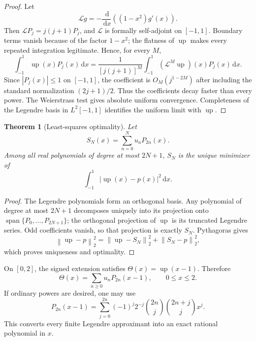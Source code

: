 \documentclass[11pt,oneside]{article}
\newtheorem{theorem}{Theorem}[section]
\theoremstyle{definition}
\theoremstyle{remark}
\newcommand{\upf}{\operatorname{up}}
\newcommand{\dd}{\,\mathrm d}
\newcommand{\Thetaf}{\Theta}
\newcommand{\norm}[1]{\left\lVert#1\right\rVert}
\begin{document}
\begin{proof}
Let
\begin{equation}\label{eq:Legendre-operator}
  \mathcal Lg=-\frac{\dd}{\dd x}\left((1-x^2)g'(x)\right).
\end{equation}
Then $\mathcal LP_j=j(j+1)P_j$, and $\mathcal L$ is formally self-adjoint on
$[-1,1]$.  Boundary terms vanish because of the factor $1-x^2$; the flatness of
$\upf$ makes every repeated integration legitimate.  Hence, for every $M$,
\begin{equation}\label{eq:Legendre-decay-proof}
 \int_{-1}^{1}\upf(x)P_j(x)\dd x
 =\frac{1}{[j(j+1)]^M}
 \int_{-1}^{1}(\mathcal L^M\upf)(x)P_j(x)\dd x.
\end{equation}
Since $|P_j(x)|\le1$ on $[-1,1]$, the coefficient is $O_M(j^{1-2M})$ after
including the standard normalization $(2j+1)/2$.  Thus the coefficients decay
faster than every power.  The Weierstrass test gives absolute uniform convergence.
Completeness of the Legendre basis in $L^2[-1,1]$ identifies the uniform limit with
$\upf$.
\end{proof}

\begin{theorem}[Least-squares optimality]\label{thm:Legendre-best}
Let
\begin{equation}\label{eq:Legendre-partial}
  S_N(x)=\sum_{n=0}^{N}u_nP_{2n}(x).
\end{equation}
Among all real polynomials of degree at most $2N+1$, $S_N$ is the unique minimizer
of
\begin{equation}\label{eq:L2-error}
  \int_{-1}^{1}|\upf(x)-p(x)|^2\dd x.
\end{equation}
\end{theorem}

\begin{proof}
The Legendre polynomials form an orthogonal basis.  Any polynomial of degree at
most $2N+1$ decomposes uniquely into its projection onto
$\operatorname{span}\{P_0,\ldots,P_{2N+1}\}$; the orthogonal projection of $\upf$
is its truncated Legendre series.  Odd coefficients vanish, so that projection is
exactly $S_N$.  Pythagoras gives
\[
 \norm{\upf-p}_2^2=\norm{\upf-S_N}_2^2+\norm{S_N-p}_2^2,
\]
which proves uniqueness and optimality.
\end{proof}

On $[0,2]$, the signed extension satisfies $\Thetaf(x)=\upf(x-1)$.  Therefore
\begin{equation}\label{eq:Theta-Legendre}
  \Thetaf(x)=\sum_{n\ge0}u_nP_{2n}(x-1),\qquad 0\le x\le2.
\end{equation}
If ordinary powers are desired, one may use
\begin{equation}\label{eq:shifted-Legendre-power}
 P_{2n}(x-1)=\sum_{j=0}^{2n}(-1)^j2^{-j}
 \binom{2n}{j}\binom{2n+j}{j}x^j.
\end{equation}
This converts every finite Legendre approximant into an exact rational polynomial
in $x$.
\end{document}
